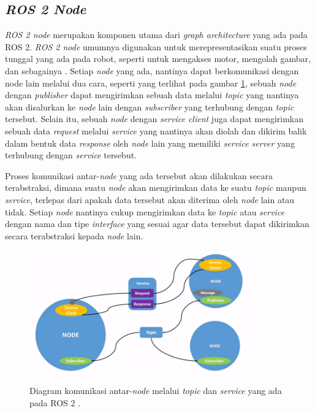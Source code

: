 \subsection{\emph{ROS 2 Node}}
\label{subsec:ros2node}

\emph{ROS 2 node} merupakan komponen utama dari \emph{graph architecture} yang ada pada ROS 2.
\emph{ROS 2 node} umumnya digunakan untuk merepresentasikan suatu proses tunggal yang ada pada robot,
  seperti untuk mengakses motor, mengolah gambar, dan sebagainya \citep{url:understandingros2nodes}.
Setiap \emph{node} yang ada, nantinya dapat berkomunikasi dengan node lain melalui dua cara,
  seperti yang terlihat pada gambar \ref{fig:diagramnoderos2},
  sebuah \emph{node} dengan \emph{publisher} dapat mengirimkan sebuah data melalui \emph{topic} yang nantinya akan disalurkan ke \emph{node} lain dengan \emph{subscriber} yang terhubung dengan \emph{topic} tersebut.
Selain itu, sebuah \emph{node} dengan \emph{service client} juga dapat mengirimkan sebuah data \emph{request} melalui \emph{service} yang nantinya akan diolah dan dikirim balik dalam bentuk data \emph{response} oleh \emph{node} lain yang memiliki \emph{service server} yang terhubung dengan \emph{service} tersebut.

Proses komunikasi antar-\emph{node} yang ada tersebut akan dilakukan secara terabstraksi,
  dimana suatu \emph{node} akan mengirimkan data ke suatu \emph{topic} maupun \emph{service},
  terlepas dari apakah data tersebut akan diterima oleh \emph{node} lain atau tidak.
Setiap \emph{node} nantinya cukup mengirimkan data ke \emph{topic} atau \emph{service} dengan nama dan tipe \emph{interface} yang sesuai agar data tersebut dapat dikirimkan secara terabstraksi kepada \emph{node} lain.

\begin{figure}
  \centering
  \includegraphics[width=0.9\textwidth,keepaspectratio]{gambar/diagram-node-ros2.png}
  \caption{Diagram komunikasi antar-\emph{node} melalui \emph{topic} dan \emph{service} yang ada pada ROS 2 \citep{url:understandingros2nodes}.}
  \label{fig:diagramnoderos2}
\end{figure}

